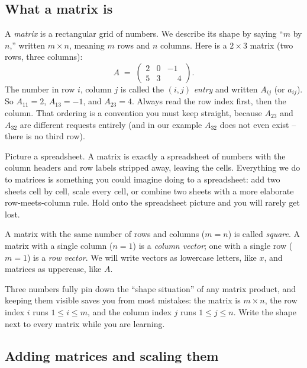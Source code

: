 \subsection{What a matrix is}

A \emph{matrix} is a rectangular grid of numbers. We describe its shape by saying
``$m$ by $n$,'' written $m \times n$, meaning $m$ rows and $n$ columns. Here is a
$2 \times 3$ matrix (two rows, three columns):
\[
A \;=\;
\begin{pmatrix}
2 & 0 & -1 \\
5 & 3 & \phantom{-}4
\end{pmatrix}.
\]
The number in row $i$, column $j$ is called the $(i,j)$ \emph{entry} and written
$A_{ij}$ (or $a_{ij}$). So $A_{11} = 2$, $A_{13} = -1$, and $A_{23} = 4$. Always
read the row index first, then the column. That ordering is a convention you must
keep straight, because $A_{23}$ and $A_{32}$ are different requests entirely (and
in our example $A_{32}$ does not even exist -- there is no third row).

\begin{intuitionbox}
Picture a spreadsheet. A matrix is exactly a spreadsheet of numbers with the
column headers and row labels stripped away, leaving the cells. Everything
we do to matrices is something you could imagine doing to a spreadsheet: add two
sheets cell by cell, scale every cell, or combine two sheets with a more
elaborate row-meets-column rule. Hold onto the spreadsheet picture and you will
rarely get lost.
\end{intuitionbox}

A matrix with the same number of rows and columns ($m = n$) is called
\emph{square}. A matrix with a single column ($n = 1$) is a \emph{column vector};
one with a single row ($m = 1$) is a \emph{row vector}. We will write vectors as
lowercase letters, like $x$, and matrices as uppercase, like $A$.

\begin{focusbox}
Three numbers fully pin down the ``shape situation'' of any matrix product, and
keeping them visible saves you from most mistakes: the matrix is $m \times n$,
the row index $i$ runs $1 \le i \le m$, and the column index $j$ runs
$1 \le j \le n$. Write the shape next to every matrix while you are learning.
\end{focusbox}

\subsection{Adding matrices and scaling them}

